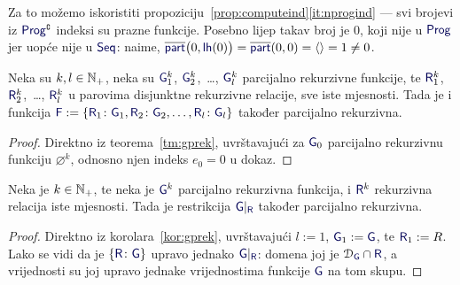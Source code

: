 Za to možemo iskoristiti propoziciju~\ref{prop:computeind}\eqref{it:nprogind} --- svi brojevi iz $\f{Prog}\kompl$ indeksi su prazne funkcije. Posebno lijep takav broj je $0$, koji nije u $\f{Prog}$ jer uopće nije u $\f{Seq}$: naime, $\overline{\f{part}}\bigl(0,\f{lh}(0)\bigr)=\overline{\f{part}}(0,0)=\langle\rangle=1\not=0$.

\begin{korolar}\label{kor:gprek}
Neka su $k,l\in{\mathbb N}_+$, neka su $\f G_1^k$, $\f G_2^k$,~\ldots, $\f G_l^k$ parcijalno rekurzivne funkcije, te $\f R_1^k$, $\f R_2^k$,~\ldots, $\f R_l^k$ u parovima disjunktne rekurzivne relacije, sve iste mjesnosti. Tada je i funkcija $\f F:=\{\f R_1\colon\f G_1,\f R_2\colon\f G_2,\dotsc,\f R_l\colon\f G_l\}$ također parcijalno rekurzivna.
\end{korolar}
\begin{proof}
Direktno iz teorema~\ref{tm:gprek}, uvrštavajući za $\f G_0$ parcijalno rekurzivnu funkciju $\varnothing^k$, odnosno njen indeks $e_0=0$ u dokaz.
\end{proof}

\begin{korolar}\label{kor:restrprek}
Neka je $k\in{\mathbb N}_+$, te neka je $\f G^k$ parcijalno rekurzivna funkcija, i $\f R^k$ rekurzivna relacija iste mjesnosti. Tada je restrikcija $\f G|_{\f R}$ također parcijalno rekurzivna.
\end{korolar}
\begin{proof}
Direktno iz korolara~\ref{kor:gprek}, uvrštavajući $l:=1$, $\f G_1:=\f G$, te $\f R_1:=R$. Lako se vidi da je $\{\f R\colon\f G\}$ upravo jednako $\f G|_{\f R}$: domena joj je $\dom{\f G}\cap\f R$, a vrijednosti su joj upravo jednake vrijednostima funkcije $\f G$ na tom skupu.
\end{proof}

